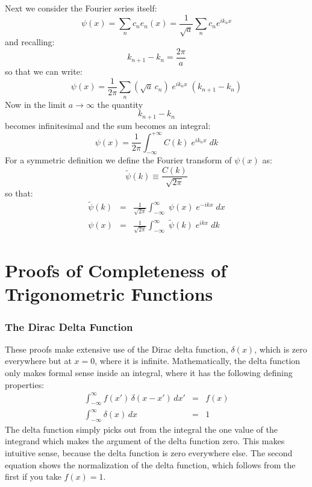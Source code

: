 \documentclass[12pt]{book}
\begin{document}
Next we consider the Fourier series itself:
$$\psi(x) = \sum_n c_n e_n(x) = \frac{1}{\sqrt{a}} \sum_n c_n e^{i k_n x}$$
and recalling:
$$k_{n+1}-k_n = \frac{2\pi}{a}$$
so that we can write:
$$\psi(x) = \frac{1}{2\pi} \sum_n (\sqrt{a} \, c_n) \; e^{i k_n x} \; (k_{n+1}-k_{n})$$
Now in the limit $a \to \infty$ the quantity $$k_{n+1}-k_{n}$$ becomes infinitesimal 
and the sum becomes an integral:
$$\psi(x) = \frac{1}{2\pi} \int_{-\infty}^{+\infty} C(k) \; e^{i k_n x} \; dk$$
For a symmetric definition we define the Fourier transform of $\psi(x)$ as:
\begin{equation*}
\widetilde{\psi}(k) \equiv \frac{C(k)}{\sqrt{2\pi}} 
\end{equation*}
so that:
\begin{eqnarray}
\widetilde{\psi}(k) &=& \frac{1}{\sqrt{2\pi}} 
\int_{-\infty}^{\infty} \; \psi(x) \; e^{-ikx} \; dx \\[8pt]
\psi(x) &=& \frac{1}{\sqrt{2\pi}} 
\int_{-\infty}^{\infty} \; \widetilde{\psi}(k) \; e^{ikx} \; dk
\end{eqnarray}



\chapter{Proofs of Completeness of Trigonometric Functions}


\subsection{The Dirac Delta Function}

These proofs make extensive use of the Dirac delta function, $\delta(x)$, which is zero everywhere but at $x=0$, where it is infinite.  Mathematically, the delta function only makes formal sense inside an integral, where it has the following defining properties:
\begin{eqnarray}
\int_{-\infty}^{\infty} f(x') \, \delta(x-x') \, dx' &=& f(x) \\
\int_{-\infty}^{\infty} \delta(x) \, dx &=& 1 \label{eqn:norm}
 \end{eqnarray}
The delta function simply picks out from the integral the one value of the integrand which makes the argument of the delta function zero.  This makes intuitive sense, because the delta function is zero everywhere else.  The second equation shows the normalization of the delta function, which follows from the first if you take $f(x)=1$.
\end{document}
